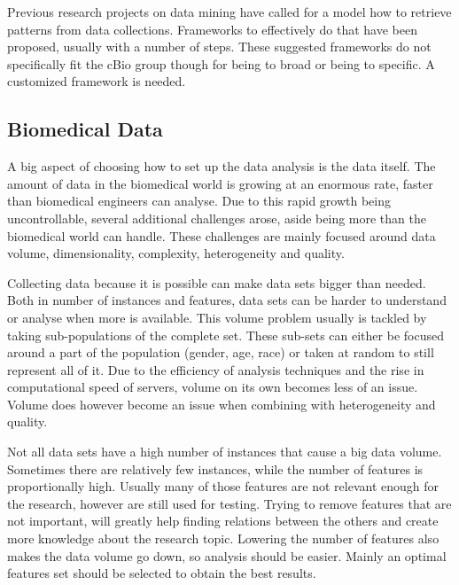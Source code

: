\documentclass[10pt,a4paper]{article}
\begin{document}
	Previous research projects on data mining have called for a model how to retrieve patterns from data collections. Frameworks to effectively do that have been proposed, usually with a number of steps.\cite{CIOS20021} These suggested frameworks do not specifically fit the cBio group though for being to broad \cite{fayyad1996knowledge} or being to specific. \cite{cios2000knowledge} A customized framework is needed. 
	
	\subsection{Biomedical Data}
	\label{subsec:BiomedicalData}
	
	A big aspect of choosing how to set up the data analysis is the data itself. The amount of data in the biomedical world is growing at an enormous rate, faster than biomedical engineers can analyse. Due to this rapid growth being uncontrollable, several additional challenges arose, aside being more than the biomedical world can handle. These challenges are mainly focused around data volume, dimensionality, complexity, heterogeneity and quality.\cite{chen2006medical, doi:10.1093/bib/bbx044}
	
	Collecting data because it is possible can make data sets bigger than needed. Both in number of instances and features, data sets can be harder to understand or analyse when more is available.\cite{chen2006medical} This volume problem usually is tackled by taking sub-populations of the complete set. These sub-sets can either be focused around a part of the population (gender, age, race) or taken at random to still represent all of it. Due to the efficiency of analysis techniques and the rise in computational speed of servers\cite{blythe2008rise}, volume on its own becomes less of an issue. Volume does however become an issue when combining with heterogeneity and quality. \cite{Turkay2014, Holzinger2014} 
	
	Not all data sets have a high number of instances that cause a big data volume. Sometimes there are relatively few instances, while the number of features is proportionally high. \cite{dubitzky2007fundamentals} Usually many of those features are not relevant enough for the research, however are still used for testing. Trying to remove features that are not important, will greatly help finding relations between the others and create more knowledge about the research topic. Lowering the number of features also makes the data volume go down, so analysis should be easier. Mainly an optimal features set should be selected to obtain the best results. \cite{PENG201015}
	
\end{document}
